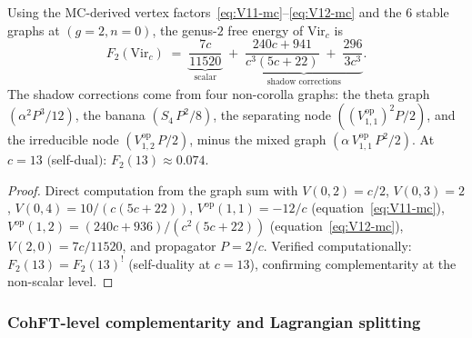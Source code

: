 \begin{proposition}%
\label{prop:virasoro-F2-full}%
\ClaimStatusProvedHere%
%
Using the MC-derived vertex
factors~\eqref{eq:V11-mc}--\eqref{eq:V12-mc} and the
$6$ stable graphs at $(g{=}2, n{=}0)$, the genus-$2$ free
energy of $\mathrm{Vir}_c$ is
\begin{equation}\label{eq:virasoro-F2-full}
F_2(\mathrm{Vir}_c)
\;=\;
\underbrace{\frac{7c}{11520}}_{\text{scalar}}
\;+\;
\underbrace{
\frac{240c+941}{c^3(5c+22)}
\;+\;
\frac{296}{3c^3}
}_{\text{shadow corrections}}.
\end{equation}
The shadow corrections come from four non-corolla graphs:
the theta graph $(\alpha^2 P^3/12)$, the banana
$(S_4\,P^2/8)$, the separating node
$((V^{\mathrm{op}}_{1,1})^2 P/2)$,
and the irreducible node
$(V^{\mathrm{op}}_{1,2}\,P/2)$,
minus the mixed graph
$(\alpha\,V^{\mathrm{op}}_{1,1}\,P^2/2)$.
At $c = 13$ $($self-dual$)$:
$F_2(13) \approx 0.074$.
\end{proposition}

\begin{proof}
Direct computation from the graph sum with
$V(0,2) = c/2$,
$V(0,3) = 2$,
$V(0,4) = 10/(c(5c+22))$,
$V^{\mathrm{op}}(1,1) = -12/c$
(equation~\eqref{eq:V11-mc}),
$V^{\mathrm{op}}(1,2) = (240c+936)/(c^2(5c+22))$
(equation~\eqref{eq:V12-mc}),
$V(2,0) = 7c/11520$,
and propagator $P = 2/c$.
Verified computationally: $F_2(13) = F_2(13)^!$
(self-duality at $c = 13$), confirming
complementarity at the non-scalar level.
\end{proof}

\subsubsection{CohFT-level complementarity and Lagrangian splitting}
\label{subsubsec:cohft-lagrangian}

